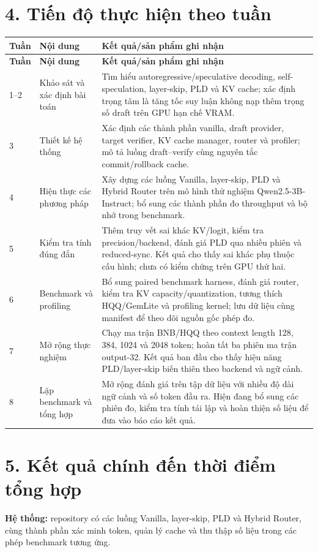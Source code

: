 \section*{4. Tiến độ thực hiện theo tuần}
\small
\begin{longtable}{p{1.6cm} p{3.6cm} p{8.5cm}}
\toprule
\textbf{Tuần} & \textbf{Nội dung} & \textbf{Kết quả/sản phẩm ghi nhận} \\
\midrule
\endfirsthead
\toprule
\textbf{Tuần} & \textbf{Nội dung} & \textbf{Kết quả/sản phẩm ghi nhận} \\
\midrule
\endhead
1--2 & Khảo sát và xác định bài toán & Tìm hiểu autoregressive/speculative decoding, self-speculation, layer-skip, PLD và KV cache; xác định trọng tâm là tăng tốc suy luận không nạp thêm trọng số draft trên GPU hạn chế VRAM. \\
3 & Thiết kế hệ thống & Xác định các thành phần vanilla, draft provider, target verifier, KV cache manager, router và profiler; mô tả luồng draft--verify cùng nguyên tắc commit/rollback cache. \\
4 & Hiện thực các phương pháp & Xây dựng các luồng Vanilla, layer-skip, PLD và Hybrid Router trên mô hình thử nghiệm Qwen2.5-3B-Instruct; bổ sung các thành phần đo throughput và bộ nhớ trong benchmark. \\
5 & Kiểm tra tính đúng đắn & Thêm truy vết sai khác KV/logit, kiểm tra precision/backend, đánh giá PLD qua nhiều phiên và reduced-sync. Kết quả cho thấy sai khác phụ thuộc cấu hình; chưa có kiểm chứng trên GPU thứ hai. \\
6 & Benchmark và profiling & Bổ sung paired benchmark harness, đánh giá router, kiểm tra KV capacity/quantization, tương thích HQQ/GemLite và profiling kernel; lưu dữ liệu cùng manifest để theo dõi nguồn gốc phép đo. \\
7 & Mở rộng thực nghiệm & Chạy ma trận BNB/HQQ theo context length 128, 384, 1024 và 2048 token; hoàn tất ba phiên ma trận output-32. Kết quả ban đầu cho thấy hiệu năng PLD/layer-skip biến thiên theo backend và ngữ cảnh. \\
8 & Lặp benchmark và tổng hợp & Mở rộng đánh giá trên tập dữ liệu với nhiều độ dài ngữ cảnh và số token đầu ra. Hiện đang bổ sung các phiên đo, kiểm tra tính tái lập và hoàn thiện số liệu để đưa vào báo cáo kết quả. \\
\bottomrule
\end{longtable}
\normalsize

\section*{5. Kết quả chính đến thời điểm tổng hợp}
\textbf{Hệ thống:} repository có các luồng Vanilla, layer-skip, PLD và Hybrid Router, cùng thành phần xác minh token, quản lý cache và thu thập số liệu trong các phép benchmark tương ứng.

